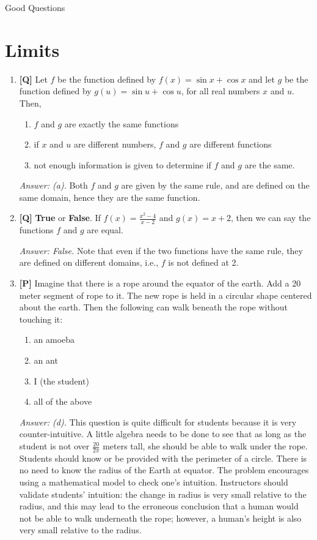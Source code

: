 \documentclass[12pt]{article}
\begin{document}
\begin{center}{\large Good Questions}\end{center}
\section {Limits}

\begin{enumerate}

\item {\bf [Q]} Let $f$ be the function defined by $f(x)=\sin x+\cos x$ and let
$g$ be the function defined by $g(u)=\sin u+\cos u$, for all real 
numbers $x$ and $u$. Then, 
\begin{enumerate}
\item $f$ and $g$ are exactly the same functions
\item if $x$ and $u$ are different numbers, $f$ and $g$ are different 
functions
\item not enough information is given to determine if 
$f$ and $g$ are the same.
\end{enumerate}

{\it Answer: (a).} Both $f$ and $g$ are given by the same rule, and are defined on the same domain, hence they are the same function.

\bigskip

\item {\bf [Q]} \textbf{True} or \textbf{False}. If 
$f(x)=\displaystyle{\frac{x^2-4}{x-2}}$ and
$g(x)=x+2$, then we can say the functions $f$ and $g$ are equal. 

{\it Answer: False.} Note that even if the two functions have the same rule, they are defined on different domains, i.e., $f$ is not defined at 2.

\bigskip

\item {\bf [P]} Imagine that there is a rope around the equator of the earth.
Add a 20 meter segment of rope to it. The new rope is held in a 
circular shape centered about the earth. Then the following can walk beneath the rope without touching it:
\begin {enumerate}
\item an amoeba
\item an ant
\item I (the student)
\item all of the above
\end{enumerate}

{\it Answer: (d).} This question is quite difficult for students because it is very 
counter-intuitive. A little algebra needs to be done to see that as long as the student 
is not over $\frac{20}{2\pi}$ meters tall, she should be able to walk under the rope. 
Students should know or be provided with the perimeter of a circle. There is no need to 
know the radius of the Earth at equator. The problem encourages using a mathematical model 
to check one's intuition. Instructors should validate students' intuition: the change 
in radius is very small relative to the radius, and this may lead to the erroneous 
conclusion that a human would not be able to walk underneath the rope; however, a human's 
height is also very small relative to the radius.


\end{enumerate}
\end{document}

